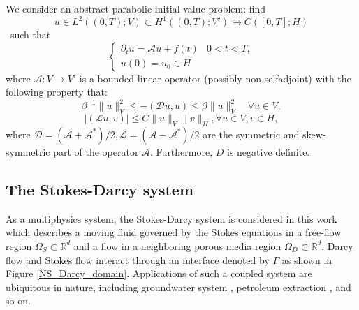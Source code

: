\documentclass[a4paper, oneside]{book}
\def\calA{{\mathcal{A}}}
\def\calA{{\mathcal{A}}}
\def\calD{{\mathcal{D}}}
\def\calL{{\mathcal{L}}}
\def\embed{{\hookrightarrow}}
\def\R{{\mathbb R}}
\begin{document}
We consider an abstract parabolic initial value problem: 
find
$$u \in L^2((0,T);V) \subset H^1((0,T);V')\embed C([0,T];H)$$\
such that 
\begin{equation}\label{eq:abstract}
    \begin{cases}
    \partial_t u = \calA u + f(t) & 0 < t < T,\\
    u(0) = u_0  \in H
  \end{cases}
\end{equation}
where $\calA: V \to V'$ is a bounded linear operator (possibly non-selfadjoint) 
with the following property that:
\begin{equation}\label{eq:beta}\beta^{-1}\|u\|_V^2 \leq -(\calD u, u) \leq \beta \|u\|_V^2 \quad \forall u \in V, 
\end{equation}
$$ \lvert(\calL u, v)\rvert \leq C \|u\|_V \|v\|_H, 
\forall u\in V, v \in H,$$
where $\calD = (\calA+\calA^*)/2, \calL = (\calA-\calA^*)/2$ are the symmetric and skew-symmetric 
part of the operator $\calA$. Furthermore, $D$ is negative definite. 

\subsection*{The Stokes-Darcy system}
As a multiphysics system, the Stokes-Darcy system is considered in this work which describes a moving fluid governed by the Stokes equations in a free-flow region $\Omega_S\subset\R^d$ and a flow in a neighboring  porous media region $\Omega_D\subset\R^d$. Darcy flow and Stokes flow interact through an interface denoted by $\Gamma$ as shown in Figure \ref{NS_Darcy_domain}. Applications of such a coupled system are ubiquitous in nature, including groundwater system \cite{HoppePortaVassilevski:2007,HouQiuHeGuoWeiBai:2016,LaytonTranTrenchea:2013}, petroleum extraction \cite{ChenSunWang:2014}, and so on.
\end{document}
